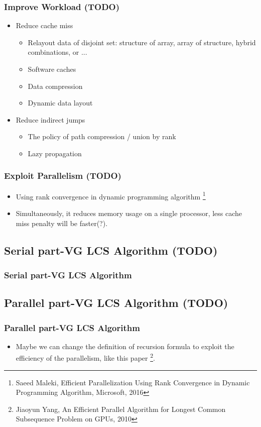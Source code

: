 \begin{frame}
	\frametitle{Improve Workload (TODO)}
	\begin{itemize}
		\setlength\itemsep{1em}
		\item Reduce cache miss
			\begin{itemize}
			 	\item Relayout data of disjoint set: structure of array, 
			 		array of structure, hybrid combinations, or ...
			 	\item Software caches
			 	\item Data compression
			 	\item Dynamic data layout
			\end{itemize}
		\item Reduce indirect jumps
			\begin{itemize}
				\item The policy of path compression / union by rank
				\item Lazy propagation
			\end{itemize}
	\end{itemize}
\end{frame}

\begin{frame}
	\frametitle{Exploit Parallelism (TODO)}
	\begin{itemize}
		\setlength\itemsep{1em}
		\item Using rank convergence in dynamic programming algorithm
			\footnote{Saeed Maleki, Efficient Parallelization Using Rank Convergence in 
				Dynamic Programming Algorithm, Microsoft, 2016}
		\item Simultaneously, it reduces memory usage on a single processor,
			less cache miss penalty will be faster(?).
	\end{itemize}
\end{frame}

\subsection{Serial part-VG LCS Algorithm (TODO)}
\begin{frame}
	\frametitle{Serial part-VG LCS Algorithm}
\end{frame}

\subsection{Parallel part-VG LCS Algorithm (TODO)}
\begin{frame}
	\frametitle{Parallel part-VG LCS Algorithm}
	\begin{itemize}
		\item Maybe we can change the definition of recursion formula to exploit the efficiency of the parallelism, like this paper
		\footnote{Jiaoyun Yang, An Efficient Parallel Algorithm for Longest Common Subsequence Problem on GPUs, 2010}.
	\end{itemize}
\end{frame}

